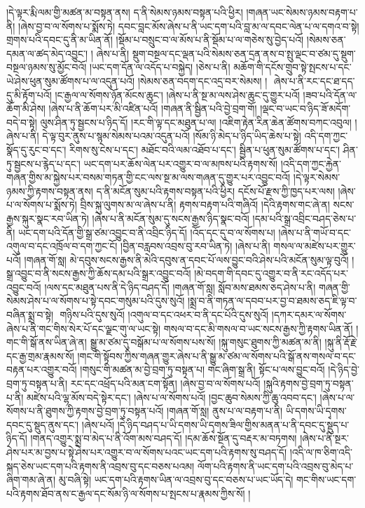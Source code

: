 །དེ་ལྟར་རྨི་ལམ་གྱི་མཚན་མ་བསྟན་ནས། ད་ནི་སེམས་ཉམས་བསྟན་པའི་ཕྱིར། །གཞན་ཡང་སེམས་ཉམས་བརྟག་པ་ནི། །ཞེས་བྱ་བ་ལ་སོགས་པ་སྨོས་ཏེ། དབང་བླང་མོས་ཞེས་པ་ནི་ཡང་དག་པའི་བླ་མ་ལ་དབང་ལེན་པ་ལ་དགའ་བ་སྟེ། གྲགས་པའི་དབང་དུ་ནི་མ་ཡིན་ནོ། །སྡོམ་པ་བསྲུང་བ་ལ་མོས་པ་ནི་སྡོམ་པ་ལ་གཅེས་སུ་བྱེད་པའོ། །སེམས་ཅན་དམན་ལ་ཚད་མེད་འབྱུང་། །
ཞེས་པ་ནི། སྡུག་བསྔལ་དང་ལྡན་པའི་སེམས་ཅན་དྲན་ནས་བ་སྤུ་ལྡང་བ་ཙམ་དུ་སྡུག་བསྔལ་ཉམས་སུ་མྱོང་བའོ། །ཡང་དག་དོན་ལ་འདོད་པ་བསྐྱེད། །ཅེས་པ་ནི། མཆོག་གི་དངོས་གྲུབ་སྟེ་སྤངས་པ་དང་ཡེ་ཤེས་ཕུན་སུམ་ཚོགས་པ་ལ་འདུན་པའོ། །སེམས་ཅན་བདག་དང་འདྲ་བར་སེམས། །  ​ ཞེས་པ་ནི་རང་དང་ཐ་དད་དུ་མི་རྟོག་པའོ། །ང་རྒྱལ་ལ་སོགས་ཉོན་མོངས་ཆུང་། །ཞེས་པ་ནི་སྔ་མ་ལས་ཤེས་ཆུང་དུ་གྱུར་པའོ། །ཟབ་པའི་དོན་ལ་ཆོག་མི་ཤེས། །ཞེས་པ་ནི་ཆོག་པར་མི་འཛིན་པའོ། །གཞན་ནི་སྦྱིན་པའི་བྱེ་བྲག་གོ། །ལྡང་བ་ཡང་བ་ཉིད་ཟོ་མདོག་བདེ་བ་སྟེ། ལུས་ཤིན་ཏུ་སྦྱངས་པ་ཉིད་དོ། །རང་གི་ལྟ་དང་མཐུན་པ་ལ། །འཇིག་རྟེན་རིན་ཆེན་ཚོགས་བཀང་འབུལ། །ཞེས་པ་ནི། དེ་ལྟ་བུར་ནུས་པ་སྙམ་སེམས་པའམ་འདུན་པའོ། །སོམ་ཉི་མེད་པ་ཉིད་ཡིད་ཆེས་པ་སྟེ། འདི་དག་ཀྱང་སྣོད་དུ་རུང་བ་དང་། རིགས་སུ་ངེས་པ་དང་། མཐོང་བའི་ལམ་འཐོབ་པ་དང་། སྦྱིན་པ་ཕུན་སུམ་ཚོགས་པ་དང་། ཤིན་ཏུ་སྦྱངས་པ་རྙེད་པ་དང་། ཡང་དག་པར་ཆོས་ལེན་པར་འགྱུར་བ་ལ་མཁས་པའི་རྟགས་སོ། །འདི་དག་ཀྱང་རྐྱེན་གཞན་གྱིས་མ་སྐྱེས་པར་བསམ་གཏན་གྱི་ངང་ལས་སྔ་མ་ལས་གཞན་དུ་གྱུར་པར་འབྱུང་བའོ། །དེ་ལྟར་སེམས་ཉམས་ཀྱི་རྟགས་བསྟན་ནས། ད་ནི་མངོན་སུམ་པའི་རྟགས་བསྟན་པའི་ཕྱིར། དངོས་པོ་རྫས་ཀྱི་ཁྱད་པར་ལས། །ཞེས་པ་ལ་སོགས་པ་སྨོས་ཏེ། བྲིས་སྐུ་ལུགས་མ་ལ་ཞེས་པ་ནི། རྟགས་བརྟག་པའི་གཞིའོ། །དེའི་རྟགས་གང་ཞེ་ན། སངས་རྒྱས་སྐུར་སྣང་རབ་ཡིན་ཏེ། །ཞེས་པ་ནི་མངོན་སུམ་དུ་སངས་རྒྱས་ཉིད་སྣང་བའོ། །དམ་པའི་སྒྲ་འབྲིང་བཤད་ཅེས་པ་ནི། ཡང་དག་པའི་དོན་གྱི་སྒྲ་ཙམ་འབྱུང་བ་ནི་འབྲིང་ཉིད་དོ། །འོད་དང་དུ་བ་ལ་སོགས་པ། །ཞེས་པ་ནི་གཡོ་བ་དང་འགུལ་བ་དང་འཁྲོལ་བ་དག་ཀྱང་ངོ། །བྱིན་བརླབས་འབྲས་བུ་རབ་ཡིན་ཏེ། །ཞེས་པ་ནི། གསལ་ལ་མཛེས་པར་གྱུར་པའོ། །གཞན་གོ་སླ། མེ་དབུས་སངས་རྒྱས་ནི་མེའི་དབུས་ན་དབང་པོ་ལས་བྱུང་བའི་ཤེས་པའི་མངོན་སུམ་ལྟ་བུའོ། །སྒྲ་འབྱུང་བ་ནི་སངས་རྒྱས་ཀྱི་ཆོས་དམ་པའི་སྒྲར་འབྱུང་བའོ། །མེ་བདག་གི་དབང་དུ་འགྱུར་བ་ནི་རང་འདོད་པར་འབྱུང་བའོ། །ལས་དང་མཐུན་པས་ནི་དེ་ཉིད་བཤད་དོ། །གཞན་གོ་སླ། སློབ་མས་ཐམས་ཅད་ཤེས་པ་ནི། གཞན་གྱི་སེམས་ཤེས་པ་ལ་སོགས་པ་སྟེ་དབང་གསུམ་པའི་དུས་སུའོ། །སྨྲ་བ་ནི་གཏན་ལ་དབབ་པར་བྱ་བ་ཐམས་ཅད་ཇི་ལྟ་བ་བཞིན་སྨྲ་བ་སྟེ།  ​ གཉིས་པའི་དུས་སུའོ། །འགུལ་བ་དང་འཕར་བ་ནི་དང་པོའི་དུས་སུའོ། །དཀར་དམར་ལ་སོགས་ཞེས་པ་ནི་གང་གིས་སེར་པོ་དང་ལྗང་གུ་ལ་ཡང་སྟེ། གསལ་བ་དང་མི་གསལ་བ་ཡང་སངས་རྒྱས་ཀྱི་རྟགས་ཡིན་ནོ། །གང་གི་སྒོ་ནས་ཡིན་ཞེ་ན། སྒྱུ་མ་ཙམ་དུ་བསྒོམ་པ་ལ་སོགས་པས་སོ། །སྐུ་གསུང་ཐུགས་ཀྱི་མཚན་མ་ནི། །སྐུ་ནི་རྡོ་རྗེ་དང་རྒྱ་གྲམ་རྣམས་སོ། །གང་གི་སྟོབས་ཀྱིས་གཞན་གྱུར་ཞེས་པ་ནི་སྒྱུ་མ་ཙམ་ལ་སོགས་པའི་སྒོ་ནས་གསལ་བ་དང་བརྟན་པར་འགྱུར་བའོ། །གསུང་གི་མཚན་མ་བྱེ་བྲག་ཏུ་བསྟན་པ། གང་ཞིག་སྒྲ་ནི། སྟོང་པ་ལས་བྱུང་བའོ། །དེ་ཉིད་བྱེ་བྲག་ཏུ་བསྟན་པ་ནི། རང་དང་འཕྲོད་པའི་མན་ངག་སྟོན། །ཞེས་བྱ་བ་ལ་སོགས་པའོ། །སྐུའི་རྟགས་བྱེ་བྲག་ཏུ་བསྟན་པ་ནི། མཛེས་པའི་ལྷ་མོས་བདེ་སྟེར་དང་། །ཞེས་པ་ལ་སོགས་པའོ། །བྱང་ཆུབ་སེམས་ཀྱི་ཆུ་འབབ་དང་། །ཞེས་པ་ལ་སོགས་པ་ནི་ཐུགས་ཀྱི་རྟགས་བྱེ་བྲག་ཏུ་བསྟན་པའོ། །གཞན་གོ་སླ། ནུས་པ་ལ་བརྟག་པ་ནི། {ཡི་དགས་ཡི་དྭགས་}དབང་དུ་སྡུད་ནུས་དང་། །ཞེས་པའོ། །དེ་ཉིད་བཤད་པ་{ཡི་དགས་ཡི་དྭགས་}ཟིལ་གྱིས་མནན་པ་ནི་དབང་དུ་སྡུད་པ་ཉིད་དོ། །གནད་འགྱུར་སྨྲ་བ་མེད་པ་ནི་འོག་མས་བཤད་དོ། །དམ་ཆོས་སྔོན་དུ་བརྡར་མ་བཏགས། །ཞེས་པ་ནི་སྔར་ཤེས་པར་མ་བྱས་པ་སྟེ་ཤེས་པར་འགྱུར་བ་ལ་སོགས་པའང་ཡང་དག་པའི་རྟགས་སུ་བཤད་དོ། །འདི་ལ་ཁ་ཅིག་འདི་སྐད་ཅེས་ཡང་དག་པའི་རྟགས་ནི་འབྲས་བུ་དང་བཅས་པའམ། ལོག་པའི་རྟགས་ནི་ཡང་དག་པའི་འབྲས་བུ་མེད་པ་ཞིག་གམ་ཞེ་ན། མུ་བཞི་སྟེ། ཡང་དག་པའི་རྟགས་ཡིན་ལ་འབྲས་བུ་དང་བཅས་པ་ཡང་ཡོད་དེ། གང་གིས་ཡང་དག་པའི་རྟགས་ཐོབ་ནས་ང་རྒྱལ་དང་སོམ་ཉི་ལ་སོགས་པ་སྤངས་པ་རྣམས་ཀྱིས་སོ། །
